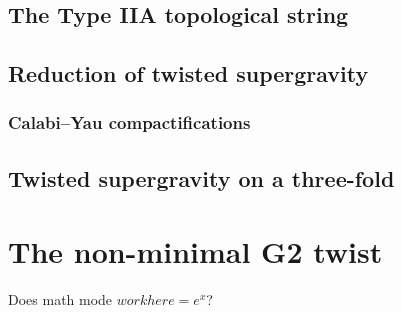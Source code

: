 \documentclass[11pt]{amsart}
\begin{document}
\subsection{The Type IIA topological string}
\label{sec:org1f7e793}
\subsection{Reduction of twisted supergravity}
\label{sec:orgcf7b6a4}
\subsubsection{Calabi--Yau compactifications}
\label{sec:org16a2c98}
\subsection{Twisted supergravity on a three-fold}
\label{sec:org774abb4}
\section{The non-minimal G2 twist}
\label{sec:org590ab85}
Does math mode \(work here = e^x\)?
\end{document}
